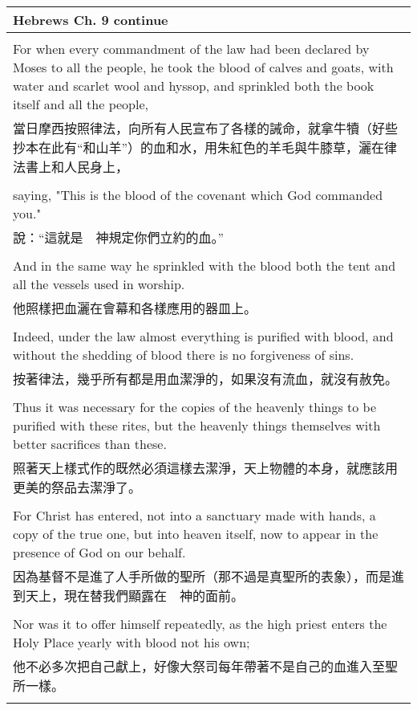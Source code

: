 \documentclass{book}
\begin{document}
\newpage
\begin{tabularx}{\textwidth}{p{}}
\hline
Hebrews Ch. 9 continue \\
\hline \\
For when every commandment of the law had been declared by Moses to all the people, he took the blood of calves and goats, with water and scarlet wool and hyssop, and sprinkled both the book itself and all the people, \\
當日摩西按照律法，向所有人民宣布了各樣的誡命，就拿牛犢（好些抄本在此有“和山羊”）的血和水，用朱紅色的羊毛與牛膝草，灑在律法書上和人民身上， \\ \\
saying, "This is the blood of the covenant which God commanded you." \\
說：“這就是　神規定你們立約的血。” \\ \\
And in the same way he sprinkled with the blood both the tent and all the vessels used in worship. \\
他照樣把血灑在會幕和各樣應用的器皿上。 \\ \\
Indeed, under the law almost everything is purified with blood, and without the shedding of blood there is no forgiveness of sins. \\
按著律法，幾乎所有都是用血潔淨的，如果沒有流血，就沒有赦免。 \\ \\
Thus it was necessary for the copies of the heavenly things to be purified with these rites, but the heavenly things themselves with better sacrifices than these. \\
照著天上樣式作的既然必須這樣去潔淨，天上物體的本身，就應該用更美的祭品去潔淨了。 \\ \\
For Christ has entered, not into a sanctuary made with hands, a copy of the true one, but into heaven itself, now to appear in the presence of God on our behalf. \\
因為基督不是進了人手所做的聖所（那不過是真聖所的表象），而是進到天上，現在替我們顯露在　神的面前。 \\ \\
Nor was it to offer himself repeatedly, as the high priest enters the Holy Place yearly with blood not his own; \\
他不必多次把自己獻上，好像大祭司每年帶著不是自己的血進入至聖所一樣。 \\ \\

\end{tabularx}
\end{document}
